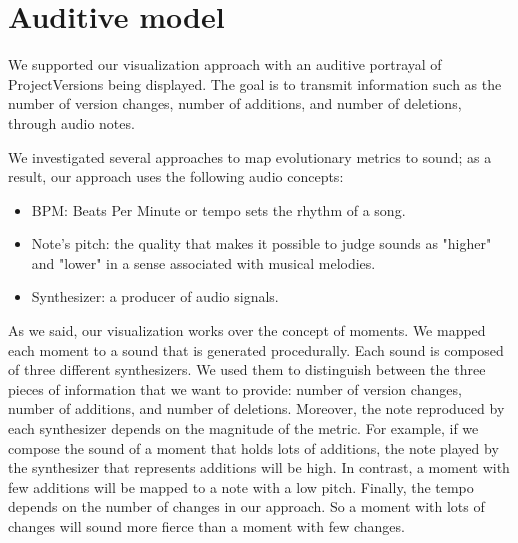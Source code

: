 \section{Auditive model}

We supported our visualization approach with an auditive portrayal of ProjectVersions being displayed. The goal is to transmit information such as the number of version changes, number of additions, and number of deletions, through audio notes. 

We investigated several approaches to map evolutionary metrics to sound; as a result, our approach uses the following audio concepts:
\begin{itemize}
	\item BPM: Beats Per Minute or tempo sets the rhythm of a song. 
	\item Note's pitch: the quality that makes it possible to judge sounds as "higher" and "lower" in a sense associated with musical melodies.
	\item Synthesizer: a producer of audio signals. 
\end{itemize}

As we said, our visualization works over the concept of moments. We mapped each moment to a sound that is generated procedurally. 
Each sound is composed of three different synthesizers. We used them to distinguish between the three pieces of information that we want to provide: number of version changes, number of additions, and number of deletions. Moreover, the note reproduced by each synthesizer depends on the magnitude of the metric. For example, if we compose the sound of a moment that holds lots of additions, the note played by the synthesizer that represents additions will be high. In contrast, a moment with few additions will be mapped to a note with a low pitch. Finally, the tempo depends on the number of changes in our approach. So a moment with lots of changes will sound more fierce than a moment with few changes. 













